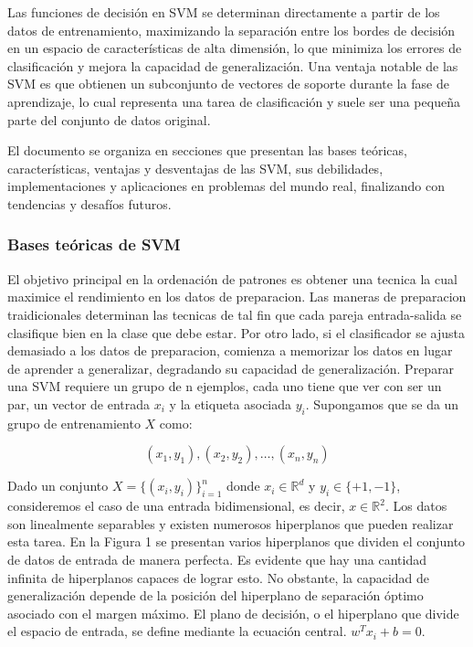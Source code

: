 Las funciones de decisión en SVM se determinan directamente a partir de los datos de entrenamiento, maximizando la separación entre los bordes de decisión en un espacio de características de alta dimensión, lo que minimiza los errores de clasificación y mejora la capacidad de generalización. Una ventaja notable de las SVM es que obtienen un subconjunto de vectores de soporte durante la fase de aprendizaje, lo cual representa una tarea de clasificación y suele ser una pequeña parte del conjunto de datos original.

El documento se organiza en secciones que presentan las bases teóricas, características, ventajas y desventajas de las SVM, sus debilidades, implementaciones y aplicaciones en problemas del mundo real, finalizando con tendencias y desafíos futuros.
\subsubsection{Bases teóricas de SVM}

El objetivo principal en la ordenación de patrones es obtener una tecnica la cual maximice el rendimiento en los datos de preparacion. Las maneras de preparacion traidicionales determinan las tecnicas de tal fin que cada pareja entrada-salida se clasifique bien en la clase que debe estar. Por otro lado, si el clasificador se ajusta demasiado a los datos de preparacion, comienza a memorizar los datos en lugar de aprender a generalizar, degradando su capacidad de generalización. 
Preparar una SVM requiere un grupo de n ejemplos, cada uno tiene que ver con ser un par, un vector de entrada \(x_i\) y la etiqueta asociada \(y_i\). Supongamos que se da un grupo de entrenamiento \(X\) como:

\begin{equation}
	(x_1, y_1), (x_2, y_2), \ldots, (x_n, y_n)
\end{equation}

Dado un conjunto $X = \{(x_i, y_i)\}_{i=1}^n$ donde $x_i \in \mathbb{R}^d$ y $y_i \in \{+1, -1\}$, consideremos el caso de una entrada bidimensional, es decir, $x \in \mathbb{R}^2$. Los datos son linealmente separables y existen numerosos hiperplanos que pueden realizar esta tarea. En la Figura 1 se presentan varios hiperplanos que dividen el conjunto de datos de entrada de manera perfecta. Es evidente que hay una cantidad infinita de hiperplanos capaces de lograr esto. No obstante, la capacidad de generalización depende de la posición del hiperplano de separación óptimo asociado con el margen máximo. El plano de decisión, o el hiperplano que divide el espacio de entrada, se define mediante la ecuación central. $w^T x_i + b = 0$.

